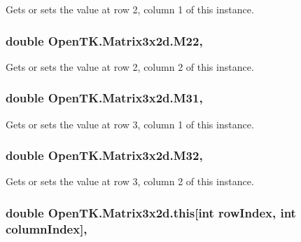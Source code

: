 Gets or sets the value at row 2, column 1 of this instance. 

\hypertarget{struct_open_t_k_1_1_matrix3x2d_a402c9a6d2b57c42b46c5ddb65c82f272}{
\subsubsection[{M22}]{\setlength{\rightskip}{0pt plus 5cm}double Open\-T\-K.\-Matrix3x2d.\-M22\hspace{0.3cm}{\ttfamily [get]}, {\ttfamily [set]}}}\label{struct_open_t_k_1_1_matrix3x2d_a402c9a6d2b57c42b46c5ddb65c82f272}


Gets or sets the value at row 2, column 2 of this instance. 

\hypertarget{struct_open_t_k_1_1_matrix3x2d_a380ae1743858e3ba466796bf424840f3}{
\subsubsection[{M31}]{\setlength{\rightskip}{0pt plus 5cm}double Open\-T\-K.\-Matrix3x2d.\-M31\hspace{0.3cm}{\ttfamily [get]}, {\ttfamily [set]}}}\label{struct_open_t_k_1_1_matrix3x2d_a380ae1743858e3ba466796bf424840f3}


Gets or sets the value at row 3, column 1 of this instance. 

\hypertarget{struct_open_t_k_1_1_matrix3x2d_ad49bb750b4990921812f9edce75d8dd2}{
\subsubsection[{M32}]{\setlength{\rightskip}{0pt plus 5cm}double Open\-T\-K.\-Matrix3x2d.\-M32\hspace{0.3cm}{\ttfamily [get]}, {\ttfamily [set]}}}\label{struct_open_t_k_1_1_matrix3x2d_ad49bb750b4990921812f9edce75d8dd2}


Gets or sets the value at row 3, column 2 of this instance. 

\hypertarget{struct_open_t_k_1_1_matrix3x2d_afd2d46fce0842b8e16cc6b21f62b8154}{
\subsubsection[{this[int row\-Index, int column\-Index]}]{\setlength{\rightskip}{0pt plus 5cm}double Open\-T\-K.\-Matrix3x2d.\-this\mbox{[}int row\-Index, int column\-Index\mbox{]}\hspace{0.3cm}{\ttfamily [get]}, {\ttfamily [set]}}}\label{struct_open_t_k_1_1_matrix3x2d_afd2d46fce0842b8e16cc6b21f62b8154}


